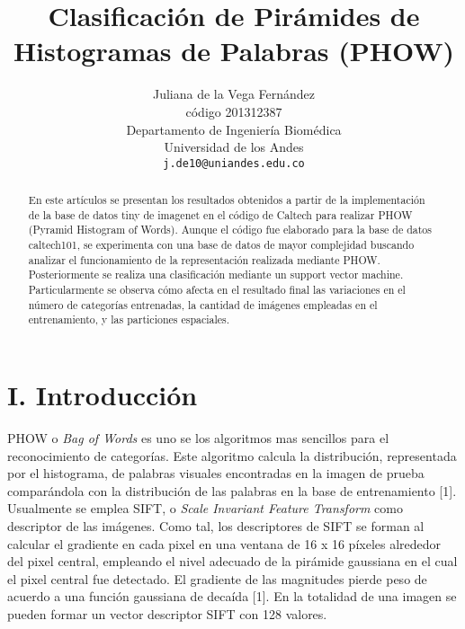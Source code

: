 \documentclass[10pt,twocolumn,letterpaper]{article}
\begin{document}
\title{Clasificación de Pirámides de Histogramas de Palabras (PHOW)}

\author{Juliana de la Vega Fernández\\
código 201312387\\
Departamento de Ingeniería Biomédica\\
Universidad de los Andes\\
{\tt\small j.de10@uniandes.edu.co}}

\maketitle

\begin{abstract}
   En este artículos se presentan los resultados obtenidos a partir de la implementación de la base de datos tiny de imagenet en el código de Caltech para realizar PHOW (Pyramid Histogram of Words). Aunque el código fue elaborado para la base de datos caltech101, se experimenta con una base de datos de mayor complejidad buscando analizar el funcionamiento de la representación realizada mediante PHOW. Posteriormente se realiza una clasificación mediante un support vector machine. Particularmente se observa cómo afecta en el resultado final las variaciones en el número de categorías entrenadas, la cantidad de imágenes empleadas en el entrenamiento, y las particiones espaciales.
\end{abstract}

\section{\textbf{I. Introducción}}

PHOW o \textit{Bag of Words} es uno se los algoritmos mas sencillos para el reconocimiento de categorías. Este algoritmo calcula la distribución, representada por el histograma, de palabras visuales encontradas en la imagen de prueba comparándola con la distribución de las palabras en la base de entrenamiento [1]. Usualmente se emplea SIFT, o \textit{Scale Invariant Feature Transform} como descriptor de las imágenes. Como tal, los descriptores de SIFT se forman al calcular el gradiente en cada pixel en una ventana de 16 x 16 píxeles alrededor del pixel central, empleando el nivel adecuado de la pirámide gaussiana en el cual el pixel central fue detectado. El gradiente de las magnitudes pierde peso de acuerdo a una función gaussiana de decaída [1]. En la totalidad de una imagen se pueden formar un vector descriptor SIFT con 128 valores. 
\end{document}
